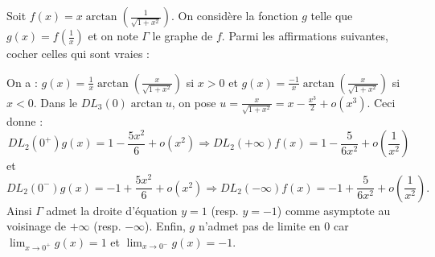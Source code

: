 \begin{question}
Soit $\displaystyle f(x)=x\arctan \left(\frac{1}{\sqrt{1+x^2}}\right)$. On considère la fonction $g$ telle que $\displaystyle g(x)=f\left(\frac{1}{x}\right)$ et on note $\Gamma$ le graphe de $f$. Parmi les affirmations suivantes, cocher celles qui sont vraies :
\begin{answers}  
\end{answers}
\vskip2mm
\begin{explanations}
On a : $\displaystyle g(x)=\frac{1}{x}\arctan \left(\frac{x}{\sqrt{1+x^2}}\right)$ si $x>0$ et $\displaystyle g(x)=\frac{-1}{x}\arctan \left(\frac{x}{\sqrt{1+x^2}}\right)$ si $x<0$. Dans le $DL_3(0)\arctan u$, on pose $\displaystyle u=\frac{x}{\sqrt{1+x^2}}=x-\frac{x^3}{2}+o(x^3)$. Ceci donne :
$$DL_2(0^+)g(x)=1-\frac{5x^2}{6}+o(x^2)\Rightarrow DL_2(+\infty)f(x)=1-\frac{5}{6x^2}+o\left(\frac{1}{x^2}\right)$$
et
$$DL_2(0^-)g(x)=-1+\frac{5x^2}{6}+o(x^2)\Rightarrow DL_2(-\infty)f(x)=-1+\frac{5}{6x^2}+o\left(\frac{1}{x^2}\right).$$
Ainsi $\Gamma$ admet la droite d'équation $\displaystyle y=1$ (resp. $y=-1$) comme asymptote au voisinage de $+\infty$ (resp. $-\infty$). Enfin, $g$ n'admet pas de limite en $0$ car $\displaystyle \lim _{x\to 0^+}g(x)=1$ et $\displaystyle \lim _{x\to 0^-}g(x)=-1$.
\end{explanations}
\end{question}

